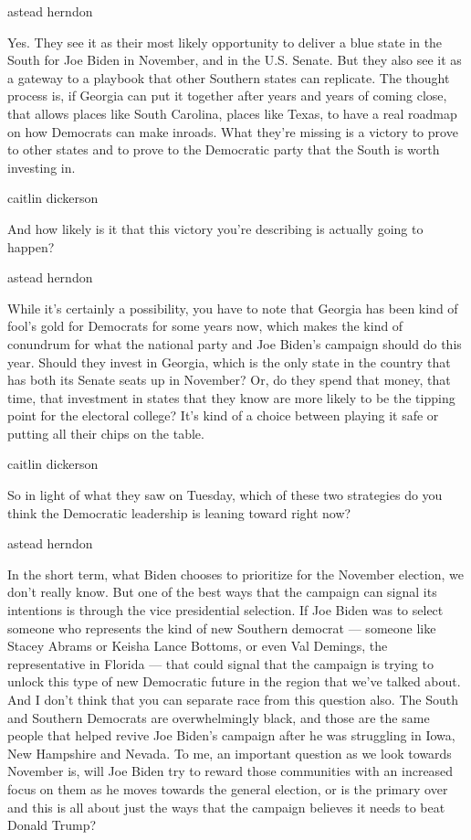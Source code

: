 astead herndon

Yes. They see it as their most likely opportunity to deliver a blue
state in the South for Joe Biden in November, and in the U.S. Senate.
But they also see it as a gateway to a playbook that other Southern
states can replicate. The thought process is, if Georgia can put it
together after years and years of coming close, that allows places like
South Carolina, places like Texas, to have a real roadmap on how
Democrats can make inroads. What they're missing is a victory to prove
to other states and to prove to the Democratic party that the South is
worth investing in.

caitlin dickerson

And how likely is it that this victory you're describing is actually
going to happen?

astead herndon

While it's certainly a possibility, you have to note that Georgia has
been kind of fool's gold for Democrats for some years now, which makes
the kind of conundrum for what the national party and Joe Biden's
campaign should do this year. Should they invest in Georgia, which is
the only state in the country that has both its Senate seats up in
November? Or, do they spend that money, that time, that investment in
states that they know are more likely to be the tipping point for the
electoral college? It's kind of a choice between playing it safe or
putting all their chips on the table.

caitlin dickerson

So in light of what they saw on Tuesday, which of these two strategies
do you think the Democratic leadership is leaning toward right now?

astead herndon

In the short term, what Biden chooses to prioritize for the November
election, we don't really know. But one of the best ways that the
campaign can signal its intentions is through the vice presidential
selection. If Joe Biden was to select someone who represents the kind of
new Southern democrat --- someone like Stacey Abrams or Keisha Lance
Bottoms, or even Val Demings, the representative in Florida --- that
could signal that the campaign is trying to unlock this type of new
Democratic future in the region that we've talked about. And I don't
think that you can separate race from this question also. The South and
Southern Democrats are overwhelmingly black, and those are the same
people that helped revive Joe Biden's campaign after he was struggling
in Iowa, New Hampshire and Nevada. To me, an important question as we
look towards November is, will Joe Biden try to reward those communities
with an increased focus on them as he moves towards the general
election, or is the primary over and this is all about just the ways
that the campaign believes it needs to beat Donald Trump?

